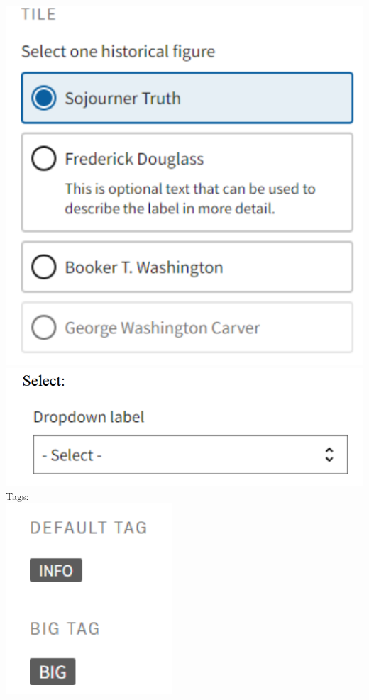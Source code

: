 \documentclass{article}
\begin{document}
\includegraphics{footers} \\
\includegraphics{radiobuttons} \\
Tags: \\
\includegraphics{tags} \\
\end{document}
